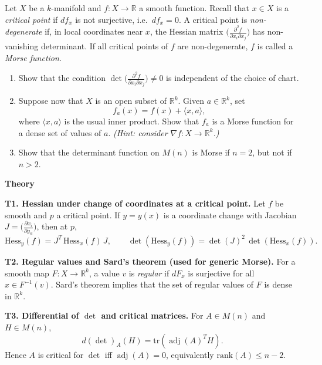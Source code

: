 \begin{problem}
\label{prob:cp-vii-0012}
Let $X$ be a $k$-manifold and $f:X\to\mathbb{R}$ a smooth function.
	Recall that $x\in X$ is a \emph{critical point} if $df_x$ is not surjective, i.e.\ $df_x=0$.
	A critical point is \emph{non-degenerate} if, in local coordinates near $x$, the Hessian matrix
	$\big(\frac{\partial^2 f}{\partial x_i\partial x_j}\big)$ has non-vanishing determinant.
	If all critical points of $f$ are non-degenerate, $f$ is called a \emph{Morse function}.
	
	\begin{enumerate}
		\item Show that the condition $\det\!\big(\frac{\partial^2 f}{\partial x_i\partial x_j}\big)\neq 0$
		is independent of the choice of chart.
		\item Suppose now that $X$ is an open subset of $\mathbb{R}^k$. Given $a\in\mathbb{R}^k$, set
		\[
		f_a(x)=f(x)+\langle x,a\rangle,
		\]
		where $\langle x,a\rangle$ is the usual inner product. Show that $f_a$ is a Morse function for a dense set
		of values of $a$. \emph{(Hint: consider $\nabla f:X\to\mathbb{R}^k$.)}
		\item Show that the determinant function on $M(n)$ is Morse if $n=2$, but not if $n>2$.
	\end{enumerate}
	
	\medskip
	\par\medskip\noindent\textbf{Theory}\par\smallskip

	
	\noindent\textbf{T1. Hessian under change of coordinates at a critical point.}
	Let $f$ be smooth and $p$ a critical point. If $y=y(x)$ is a coordinate change with Jacobian
	$J=\big(\frac{\partial x_i}{\partial y_\alpha}\big)$, then at $p$,
	\[
	\mathrm{Hess}_y(f)=J^T\,\mathrm{Hess}_x(f)\,J,
	\qquad
	\det(\mathrm{Hess}_y(f))=\det(J)^2\,\det(\mathrm{Hess}_x(f)).
	\]
	
	\medskip
	\noindent\textbf{T2. Regular values and Sard's theorem (used for generic Morse).}
	For a smooth map $F:X\to\mathbb{R}^k$, a value $v$ is \emph{regular} if $dF_x$ is surjective for all $x\in F^{-1}(v)$.
	Sard's theorem implies that the set of regular values of $F$ is dense in $\mathbb{R}^k$.
	
	\medskip
	\noindent\textbf{T3. Differential of $\det$ and critical matrices.}
	For $A\in M(n)$ and $H\in M(n)$,
	\[
	d(\det)_A(H)=\mathrm{tr}(\operatorname{adj}(A)^T H).
	\]
	Hence $A$ is critical for $\det$ iff $\operatorname{adj}(A)=0$, equivalently $\mathrm{rank}(A)\le n-2$.
	
	\medskip
\end{problem}

